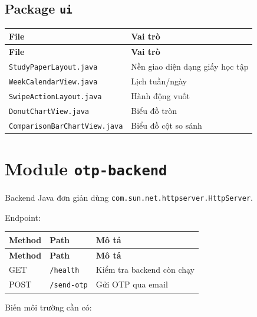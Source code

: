 \documentclass[12pt,a4paper]{report}
\begin{document}
\subsection{Package \texttt{ui}}

\begin{longtable}{|>{\raggedright\arraybackslash}p{}|>{\raggedright\arraybackslash}p{}|}
\hline
\textbf{File} & \textbf{Vai trò} \\ \hline
\endfirsthead
\hline
\textbf{File} & \textbf{Vai trò} \\ \hline
\endhead
\texttt{StudyPaperLayout.java} & Nền giao diện dạng giấy học tập \\ \hline
\texttt{WeekCalendarView.java} & Lịch tuần/ngày \\ \hline
\texttt{SwipeActionLayout.java} & Hành động vuốt \\ \hline
\texttt{DonutChartView.java} & Biểu đồ tròn \\ \hline
\texttt{ComparisonBarChartView.java} & Biểu đồ cột so sánh \\ \hline
\end{longtable}

\section{Module \texttt{otp-backend}}

Backend Java đơn giản dùng \texttt{com.sun.net.httpserver.HttpServer}.

Endpoint:

\begin{longtable}{|>{\raggedright\arraybackslash}p{}|>{\raggedright\arraybackslash}p{}|>{\raggedright\arraybackslash}p{}|}
\hline
\textbf{Method} & \textbf{Path} & \textbf{Mô tả} \\ \hline
\endfirsthead
\hline
\textbf{Method} & \textbf{Path} & \textbf{Mô tả} \\ \hline
\endhead
GET & \texttt{/health} & Kiểm tra backend còn chạy \\ \hline
POST & \texttt{/send-otp} & Gửi OTP qua email \\ \hline
\end{longtable}

Biến môi trường cần có:
\end{document}
